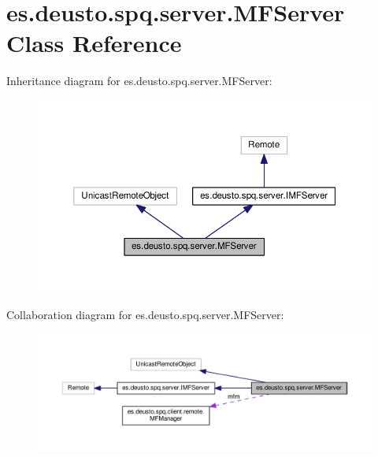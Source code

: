\hypertarget{classes_1_1deusto_1_1spq_1_1server_1_1_m_f_server}{}\section{es.\+deusto.\+spq.\+server.\+M\+F\+Server Class Reference}
\label{classes_1_1deusto_1_1spq_1_1server_1_1_m_f_server}


Inheritance diagram for es.\+deusto.\+spq.\+server.\+M\+F\+Server\+:\nopagebreak
\begin{figure}[H]
\begin{center}
\leavevmode
\includegraphics[width=350pt]{classes_1_1deusto_1_1spq_1_1server_1_1_m_f_server__inherit__graph}
\end{center}
\end{figure}


Collaboration diagram for es.\+deusto.\+spq.\+server.\+M\+F\+Server\+:\nopagebreak
\begin{figure}[H]
\begin{center}
\leavevmode
\includegraphics[width=350pt]{classes_1_1deusto_1_1spq_1_1server_1_1_m_f_server__coll__graph}
\end{center}
\end{figure}
